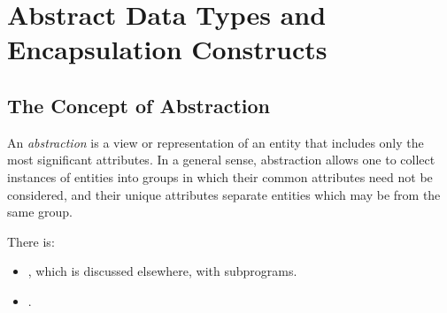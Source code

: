 \section{Abstract Data Types and Encapsulation Constructs}\label{sec:Abstract_Data_Types_Encapsulation_Constructs}
\subsection{The Concept of Abstraction}\label{subsec:Concept_Abstraction}
\begin{definition}[Abstraction]\label{def:Abstraction}
  An \emph{abstraction} is a view or representation of an entity that includes only the most significant attributes.
  In a general sense, abstraction allows one to collect instances of entities into groups in which their common attributes need not be considered, and their unique attributes separate entities which may be from the same group.

  There is:
  \begin{itemize}[noitemsep]
  \item {}, which is discussed elsewhere, with subprograms.
  \item {}.
  \end{itemize}
\end{definition}










